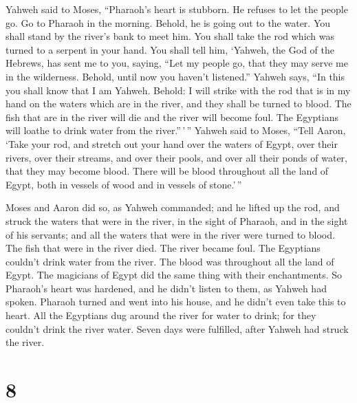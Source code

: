  Yahweh said to Moses, ``Pharaoh's heart is stubborn. He
refuses to let the people go.  Go to Pharaoh in the
morning. Behold, he is going out to the water. You shall stand by the
river's bank to meet him. You shall take the rod which was turned to a
serpent in your hand.  You shall tell him, `Yahweh, the God
of the Hebrews, has sent me to you, saying, ``Let my people go, that
they may serve me in the wilderness. Behold, until now you haven't
listened.''  Yahweh says, ``In this you shall know that I
am Yahweh. Behold: I will strike with the rod that is in my hand on the
waters which are in the river, and they shall be turned to blood.
 The fish that are in the river will die and the river will
become foul. The Egyptians will loathe to drink water from the
river.''\,'\,''  Yahweh said to Moses, ``Tell Aaron, `Take
your rod, and stretch out your hand over the waters of Egypt, over their
rivers, over their streams, and over their pools, and over all their
ponds of water, that they may become blood. There will be blood
throughout all the land of Egypt, both in vessels of wood and in vessels
of stone.'\,''

 Moses and Aaron did so, as Yahweh commanded; and he lifted
up the rod, and struck the waters that were in the river, in the sight
of Pharaoh, and in the sight of his servants; and all the waters that
were in the river were turned to blood.  The fish that were
in the river died. The river became foul. The Egyptians couldn't drink
water from the river. The blood was throughout all the land of Egypt.
 The magicians of Egypt did the same thing with their
enchantments. So Pharaoh's heart was hardened, and he didn't listen to
them, as Yahweh had spoken.  Pharaoh turned and went into
his house, and he didn't even take this to heart.  All the
Egyptians dug around the river for water to drink; for they couldn't
drink the river water.  Seven days were fulfilled, after
Yahweh had struck the river.

\hypertarget{section-7}{%
\section{8}\label{section-7}}

